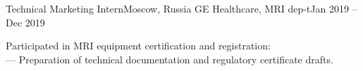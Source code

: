     \resumeSubheading
      {Technical Marketing Intern}{Moscow, Russia}
      {GE Healthcare, MRI dep-t}{Jan 2019 -- Dec 2019}
      \begin{itemize}[leftmargin=0in, label={}]
            \small{\item{
                {Participated in MRI equipment certification and registration:}\\
                {— Preparation of technical documentation and regulatory certificate drafts.}\\
            }}
      \end{itemize}